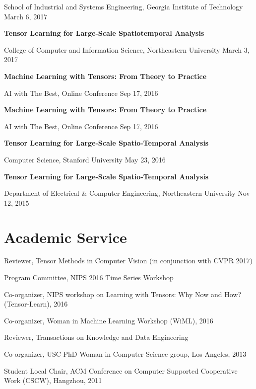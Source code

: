 \documentclass[margin,line]{res}
\begin{document}
\begin{resume}
School of Industrial and Systems Engineering, Georgia Institute of Technology  \hfill {March 6, 2017}

{\bf Tensor Learning for Large-Scale Spatiotemporal Analysis}
\vspace{-.3cm}

College of Computer and Information Science, Northeastern University  \hfill {March 3, 2017}


{\bf Machine Learning with Tensors: From Theory to Practice}
\vspace{-.3cm}

AI with The Best, Online Conference \hfill {Sep 17, 2016}


{\bf Machine Learning with Tensors: From Theory to Practice}
 \vspace{-.3cm}
 
 AI with The Best, Online Conference \hfill {Sep 17, 2016}
 
 
 {\bf Tensor Learning for Large-Scale Spatio-Temporal Analysis} 
 
 \vspace{-.3cm}
 Computer Science,  Stanford University  \hfill {May 23, 2016}
 
  {\bf Tensor Learning for Large-Scale Spatio-Temporal Analysis} 
  
 \vspace{-.3cm}
Department of  Electrical \& Computer Engineering,  Northeastern University  \hfill {Nov 12, 2015}



\section{\sc Academic Service}
Reviewer, Tensor Methods in Computer Vision (in conjunction with CVPR 2017)

Program Committee, NIPS 2016 Time Series Workshop

Co-organizer, NIPS workshop on Learning with Tensors: Why Now and How? (Tensor-Learn), 2016


Co-organizer, Woman in Machine Learning Workshop (WiML), 2016

Reviewer, Transactions on Knowledge and Data Engineering


Co-organizer, USC PhD Woman in Computer Science group, Los Angeles, 2013

Student Local Chair, ACM Conference on Computer Supported Cooperative Work (CSCW), Hangzhou, 2011


\end{resume}
\end{document}
